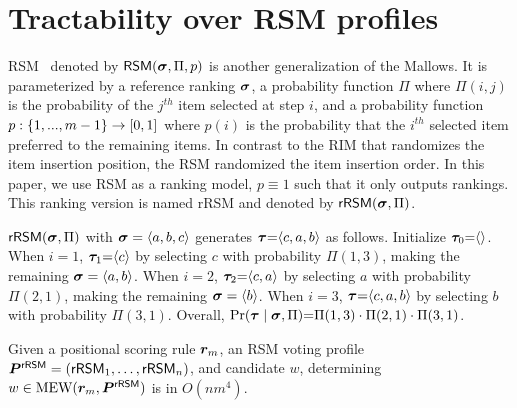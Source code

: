\section{Tractability over RSM profiles}
\label{sec:appendix:rsm_profile}

RSM~\cite{DBLP:journals/tdasci/ChakrabortyDKKR21} denoted by $\mathsf{RSM}(\bsigma, \Pi, p)$ is another generalization of the Mallows.
It is parameterized by a reference ranking $\bsigma$, a probability function $\Pi$ where $\Pi(i, j)$ is the probability of the $j^{th}$ item selected at step $i$, and a probability function $p:\set{1,...,m-1} \rightarrow [0,1]$ where $p(i)$ is the probability that the $i^{th}$ selected item preferred to the remaining items.
In contrast to the RIM that randomizes the item insertion position, the RSM randomized the item insertion order.
In this paper, we use RSM as a ranking model, \ie $p \equiv 1$ such that it only outputs rankings.
This ranking version is named rRSM and denoted by $\RSM(\bsigma, \Pi)$.

\begin{example}
    $\RSM(\bsigma, \Pi)$ with $\bsigma=\angs{a, b, c}$ generates $\ranking {=} \angs{c, a, b}$ as follows.
    Initialize $\ranking_0 {=} \angs{}$. 
    When $i=1$, $\ranking_1 {=} \angs{c}$ by selecting $c$ with probability $\Pi(1,3)$, making the remaining $\bsigma = \angs{a, b}$.
    When $i=2$, $\ranking_2 {=} \angs{c, a}$ by selecting $a$ with probability $\Pi(2,1)$, making the remaining $\bsigma = \angs{b}$.
    When $i=3$, $\ranking {=} \angs{c, a, b}$ by selecting $b$ with probability $\Pi(3,1)$. 
    Overall, $\Pr(\ranking \mid \bsigma, \Pi) {=} \Pi(1,3) \cdot \Pi(2,1) \cdot \Pi(3,1)$.
\end{example}

\begin{theorem} \label{theorem:tractability_of_rsmVP}
    Given a positional scoring rule $\vr_m$, an RSM voting profile $\rsmVP = (\enum[n]{\RSM})$, and candidate $w$, determining $w \in \mew(\vr_m, \rsmVP)$ is in $O(nm^4)$.
\end{theorem}

